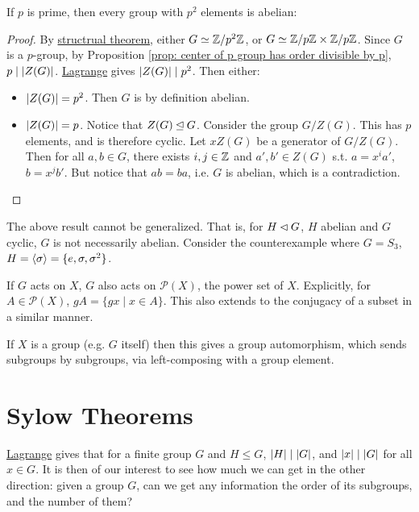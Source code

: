 \begin{corollary}
    If $p$ is prime, then every group with $p^2$ elements is abelian:
\end{corollary}

\begin{proof}
    By \hyperref[thm: structural theorem]{structrual theorem}, either $G \simeq \mathbb{Z}/p^2\mathbb{Z}$, or $G \simeq \mathbb{Z}/p\mathbb{Z} \times \mathbb{Z}/p\mathbb{Z}$. Since $G$ is a $p$-group, by Proposition \ref{prop: center of p group has order divisible by p}, $p \mid \left|Z(G)\right|$. \hyperref[thm: Lagrange]{Lagrange} gives $\left|Z(G)\right| \mid p^2$. Then either:
    \begin{itemize}
        \item $\left|Z(G)\right| = p^2$. Then $G$ is by definition abelian.
        \item $\left|Z(G)\right| = p$. Notice that $Z(G) \unlhd G$. Consider the group $G/Z(G)$. This has $p$ elements, and is therefore cyclic. Let $x Z(G)$ be a generator of $G/Z(G)$. Then for all $a, b \in G$, there exists $i, j \in \mathbb{Z}$ and $a', b' \in Z(G)$ s.t. $a = x^i a'$, $b = x^j b'$. But notice that $ab = ba$, i.e. $G$ is abelian, which is a contradiction.
    \end{itemize}
\end{proof}

\begin{remark}
    The above result cannot be generalized. That is, for $H \lhd G$, $H$ abelian and $G$ cyclic, $G$ is not necessarily abelian. Consider the counterexample where $G = S_3$, $H = \left\langle \sigma \right\rangle = \{e, \sigma, \sigma^2\}$.
\end{remark}

\begin{remark}
    If $G$ acts on $X$, $G$ also acts on $\mathcal{P}(X)$, the power set of $X$. Explicitly, for $A \in \mathcal{P}(X)$, $gA = \{gx \mid x \in A\}$. This also extends to the conjugacy of a subset in a similar manner. 

    If $X$ is a group (e.g. $G$ itself) then this gives a group automorphism, which sends subgroups by subgroups, via left-composing with a group element. 
\end{remark}

\section{Sylow Theorems}

\textstart
\hyperref[thm: Lagrange]{Lagrange} gives that for a finite group $G$ and $H \leq G$, $\left|H\right| \mid \left|G\right|$, and $\left|x\right| \mid \left|G\right|$ for all $x \in G$. It is then of our interest to see how much we can get in the other direction: given a group $G$, can we get any information the order of its subgroups, and the number of them?

